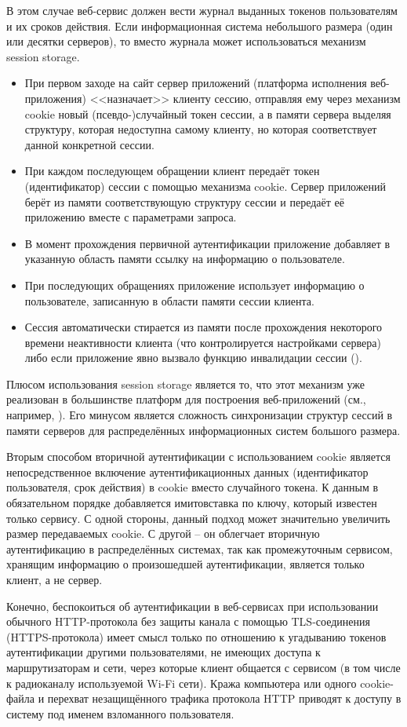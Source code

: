 В этом случае веб-сервис должен вести журнал выданных токенов пользователям и их сроков действия. Если информационная система небольшого размера (один или десятки серверов), то вместо журнала может использоваться механизм session storage.
\begin{itemize}
	\item При первом заходе на сайт сервер приложений (платформа исполнения веб-приложения) <<назначает>> клиенту сессию, отправляя ему через механизм cookie новый (псевдо-)слу\-чай\-ный токен сессии, а в памяти сервера выделяя структуру, которая недоступна самому клиенту, но которая соответствует данной конкретной сессии.
	\item При каждом последующем обращении клиент передаёт токен (идентификатор) сессии с помощью механизма cookie. Сервер приложений берёт из памяти соответствующую структуру сессии и передаёт её приложению вместе с параметрами запроса.
	\item В момент прохождения первичной аутентификации приложение добавляет в указанную область памяти ссылку на информацию о пользователе.
	\item При последующих обращениях приложение использует информацию о пользователе, записанную в области памяти сессии клиента.
	\item Сессия автоматически стирается из памяти после прохождения некоторого времени неактивности клиента (что контролируется настройками сервера) либо если приложение явно вызвало функцию инвалидации сессии ().
\end{itemize}

Плюсом использования session storage является то, что этот механизм уже реализован в большинстве платформ для построения веб-приложений (см., например, \cite[Controlling sessions]{Brittain:Darwin:2007}). Его минусом является сложность синхронизации структур сессий в памяти серверов для распределённых информационных систем большого размера.

Вторым способом вторичной аутентификации с использованием cookie является непосредственное включение аутентификационных данных (идентификатор пользователя, срок действия) в cookie вместо случайного токена. К данным в обязательном порядке добавляется имитовставка по ключу, который известен только сервису. С одной стороны, данный подход может значительно увеличить размер передаваемых cookie. С другой -- он облегчает вторичную аутентификацию в распределённых системах, так как промежуточным сервисом, хранящим информацию о произошедшей аутентификации, является только клиент, а не сервер.

Конечно, беспокоиться об аутентификации в веб-сервисах при использовании обычного HTTP-протокола без защиты канала с помощью TLS-соединения (HTTPS-протокола) имеет смысл только по отношению к угадыванию токенов аутентификации другими пользователями, не имеющих доступа к маршрутизаторам и сети, через которые клиент общается с сервисом (в том числе к радиоканалу используемой Wi-Fi сети). Кража компьютера или одного cookie-файла и перехват незащищённого трафика протокола HTTP приводят к доступу в систему под именем взломанного пользователя.
